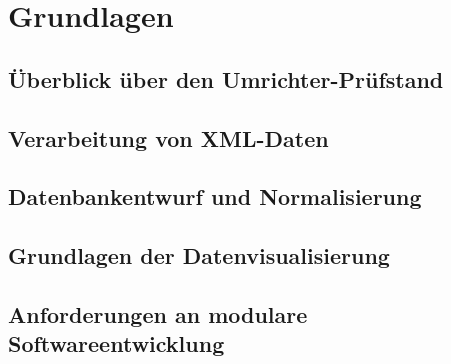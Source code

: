 
\newpage
\section{Grundlagen}
\label{Grundlagen}

\subsection{Überblick über den Umrichter-Prüfstand}

\subsection{Verarbeitung von XML-Daten}

\subsection{Datenbankentwurf und Normalisierung}

\subsection{Grundlagen der Datenvisualisierung}

\subsection{Anforderungen an modulare Softwareentwicklung}